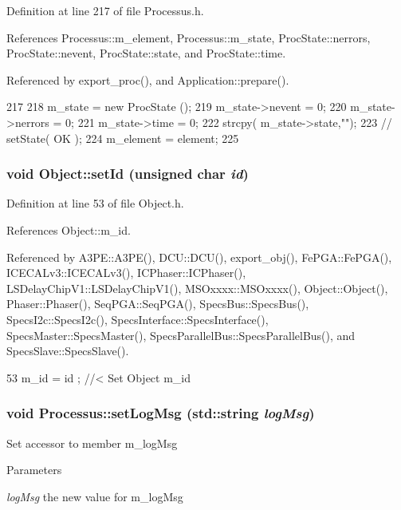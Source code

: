 Definition at line 217 of file Processus.h.

References Processus::m\_\-element, Processus::m\_\-state, ProcState::nerrors, ProcState::nevent, ProcState::state, and ProcState::time.

Referenced by export\_\-proc(), and Application::prepare().


\begin{DoxyCode}
217                                      {
218     m_state = new ProcState ();
219     m_state->nevent  = 0;
220     m_state->nerrors = 0;
221     m_state->time    = 0;
222     strcpy( m_state->state,"");
223     //  setState( OK );
224     m_element = element;
225   }
\end{DoxyCode}
\hypertarget{classObject_a398fe08cba594a0ce6891d59fe4f159f}{
\subsubsection[{setId}]{\setlength{\rightskip}{0pt plus 5cm}void Object::setId (unsigned char {\em id})}}
\label{classObject_a398fe08cba594a0ce6891d59fe4f159f}


Definition at line 53 of file Object.h.

References Object::m\_\-id.

Referenced by A3PE::A3PE(), DCU::DCU(), export\_\-obj(), FePGA::FePGA(), ICECALv3::ICECALv3(), ICPhaser::ICPhaser(), LSDelayChipV1::LSDelayChipV1(), MSOxxxx::MSOxxxx(), Object::Object(), Phaser::Phaser(), SeqPGA::SeqPGA(), SpecsBus::SpecsBus(), SpecsI2c::SpecsI2c(), SpecsInterface::SpecsInterface(), SpecsMaster::SpecsMaster(), SpecsParallelBus::SpecsParallelBus(), and SpecsSlave::SpecsSlave().


\begin{DoxyCode}
53 { m_id    = id    ; } //< Set Object m_id
\end{DoxyCode}
\hypertarget{classProcessus_a471833f89047aa9a7ff6200a31c17a1d}{
\subsubsection[{setLogMsg}]{\setlength{\rightskip}{0pt plus 5cm}void Processus::setLogMsg (std::string {\em logMsg})}}
\label{classProcessus_a471833f89047aa9a7ff6200a31c17a1d}
Set accessor to member m\_\-logMsg 
\begin{DoxyParams}{Parameters}
\item[{\em logMsg}]the new value for m\_\-logMsg \end{DoxyParams}


